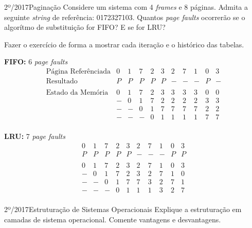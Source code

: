 \begin{exercicio}
  {2º/2017}{Paginação}
  {Considere um sistema com 4 \textit{frames} e 8 páginas. Admita a seguinte \textit{string} de referência: 0172327103. Quantos \textit{page faults} ocorrerão se o algorítmo de substituição for FIFO? E se for LRU?}

  Fazer o exercício de forma a mostrar cada iteração e o histórico das tabelas.

  \textbf{FIFO:} 6 \textit{page faults} \\
  \[
  \begin{array}{rcccccccccc}
    \text{Página Referênciada} & 0 & 1 & 7 & 2 & 3 & 2 & 7 & 1 & 0 & 3 \\ \hline
    \text{Resultado} & P & P & P & P & P & - & - & - & P & - \\
    \\
    \text{Estado da Memória} & 0 & 1 & 7 & 2 & 3 & 3 & 3 & 3 & 0 & 0 \\
    & - & 0 & 1 & 7 & 2 & 2 & 2 & 2 & 3 & 3 \\
    & - & - & 0 & 1 & 7 & 7 & 7 & 7 & 2 & 2 \\
    & - & - & - & 0 & 1 & 1 & 1 & 1 & 7 & 7 \\
  \end{array}
  \]

  \textbf{LRU:} 7 \textit{page faults} \\
  \[
  \begin{array}{cccccccccc}
    0 & 1 & 7 & 2 & 3 & 2 & 7 & 1 & 0 & 3 \\ \hline
    P & P & P & P & P & - & - & - & P & P \\
    \\
    0 & 1 & 7 & 2 & 3 & 2 & 7 & 1 & 0 & 3 \\
    - & 0 & 1 & 7 & 2 & 3 & 2 & 7 & 1 & 0 \\
    - & - & 0 & 1 & 7 & 7 & 3 & 2 & 7 & 1 \\
    - & - & - & 0 & 1 & 1 & 1 & 3 & 2 & 7 \\
  \end{array}
  \]

\end{exercicio}

\begin{exercicio}
  {2º/2017}{Estruturação de Sistemas Operacionais}
  {Explique a estruturação em camadas de sistema operacional. Comente vantagens e desvantagens.}

\end{exercicio}


